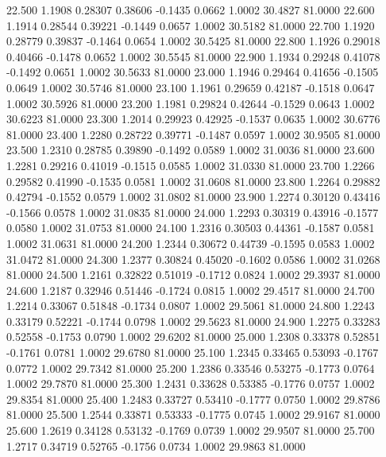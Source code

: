   22.500   1.1908   0.28307   0.38606  -0.1435   0.0662   1.0002  30.4827  81.0000
  22.600   1.1914   0.28544   0.39221  -0.1449   0.0657   1.0002  30.5182  81.0000
  22.700   1.1920   0.28779   0.39837  -0.1464   0.0654   1.0002  30.5425  81.0000
  22.800   1.1926   0.29018   0.40466  -0.1478   0.0652   1.0002  30.5545  81.0000
  22.900   1.1934   0.29248   0.41078  -0.1492   0.0651   1.0002  30.5633  81.0000
  23.000   1.1946   0.29464   0.41656  -0.1505   0.0649   1.0002  30.5746  81.0000
  23.100   1.1961   0.29659   0.42187  -0.1518   0.0647   1.0002  30.5926  81.0000
  23.200   1.1981   0.29824   0.42644  -0.1529   0.0643   1.0002  30.6223  81.0000
  23.300   1.2014   0.29923   0.42925  -0.1537   0.0635   1.0002  30.6776  81.0000
  23.400   1.2280   0.28722   0.39771  -0.1487   0.0597   1.0002  30.9505  81.0000
  23.500   1.2310   0.28785   0.39890  -0.1492   0.0589   1.0002  31.0036  81.0000
  23.600   1.2281   0.29216   0.41019  -0.1515   0.0585   1.0002  31.0330  81.0000
  23.700   1.2266   0.29582   0.41990  -0.1535   0.0581   1.0002  31.0608  81.0000
  23.800   1.2264   0.29882   0.42794  -0.1552   0.0579   1.0002  31.0802  81.0000
  23.900   1.2274   0.30120   0.43416  -0.1566   0.0578   1.0002  31.0835  81.0000
  24.000   1.2293   0.30319   0.43916  -0.1577   0.0580   1.0002  31.0753  81.0000
  24.100   1.2316   0.30503   0.44361  -0.1587   0.0581   1.0002  31.0631  81.0000
  24.200   1.2344   0.30672   0.44739  -0.1595   0.0583   1.0002  31.0472  81.0000
  24.300   1.2377   0.30824   0.45020  -0.1602   0.0586   1.0002  31.0268  81.0000
  24.500   1.2161   0.32822   0.51019  -0.1712   0.0824   1.0002  29.3937  81.0000
  24.600   1.2187   0.32946   0.51446  -0.1724   0.0815   1.0002  29.4517  81.0000
  24.700   1.2214   0.33067   0.51848  -0.1734   0.0807   1.0002  29.5061  81.0000
  24.800   1.2243   0.33179   0.52221  -0.1744   0.0798   1.0002  29.5623  81.0000
  24.900   1.2275   0.33283   0.52558  -0.1753   0.0790   1.0002  29.6202  81.0000
  25.000   1.2308   0.33378   0.52851  -0.1761   0.0781   1.0002  29.6780  81.0000
  25.100   1.2345   0.33465   0.53093  -0.1767   0.0772   1.0002  29.7342  81.0000
  25.200   1.2386   0.33546   0.53275  -0.1773   0.0764   1.0002  29.7870  81.0000
  25.300   1.2431   0.33628   0.53385  -0.1776   0.0757   1.0002  29.8354  81.0000
  25.400   1.2483   0.33727   0.53410  -0.1777   0.0750   1.0002  29.8786  81.0000
  25.500   1.2544   0.33871   0.53333  -0.1775   0.0745   1.0002  29.9167  81.0000
  25.600   1.2619   0.34128   0.53132  -0.1769   0.0739   1.0002  29.9507  81.0000
  25.700   1.2717   0.34719   0.52765  -0.1756   0.0734   1.0002  29.9863  81.0000
